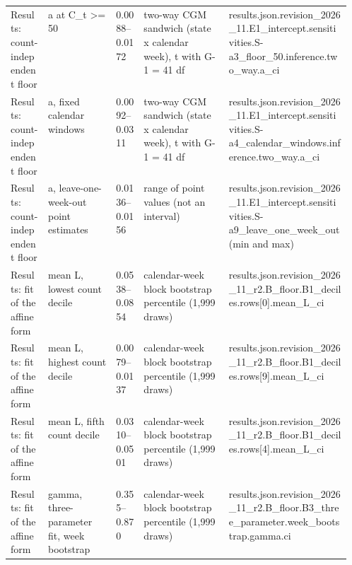 \begin{table}[!tbp]
\begin{tabularx}{\linewidth}{@{}p{0.11\linewidth}p{0.2\linewidth}lp{0.25\linewidth}X@{}}
Results: count-independent floor & a at C\_t >= 50 & 0.0088--0.0172 & two-way CGM sandwich (state x calendar week), t with G-1 = 41 df & {\ttfamily\tiny results.\allowbreak{}json.\allowbreak{}revision\_2026\_11.\allowbreak{}E1\_intercept.\allowbreak{}sensitivities.\allowbreak{}S-a3\_floor\_50.\allowbreak{}inference.\allowbreak{}two\_way.\allowbreak{}a\_ci} \\
Results: count-independent floor & a, fixed calendar windows & 0.0092--0.0311 & two-way CGM sandwich (state x calendar week), t with G-1 = 41 df & {\ttfamily\tiny results.\allowbreak{}json.\allowbreak{}revision\_2026\_11.\allowbreak{}E1\_intercept.\allowbreak{}sensitivities.\allowbreak{}S-a4\_calendar\_windows.\allowbreak{}inference.\allowbreak{}two\_way.\allowbreak{}a\_ci} \\
Results: count-independent floor & a, leave-one-week-out point estimates & 0.0136--0.0156 & range of point values (not an interval) & {\ttfamily\tiny results.\allowbreak{}json.\allowbreak{}revision\_2026\_11.\allowbreak{}E1\_intercept.\allowbreak{}sensitivities.\allowbreak{}S-a9\_leave\_one\_week\_out (min and max)} \\
Results: fit of the affine form & mean L, lowest count decile & 0.0538--0.0854 & calendar-week block bootstrap percentile (1,999 draws) & {\ttfamily\tiny results.\allowbreak{}json.\allowbreak{}revision\_2026\_11\_r2.\allowbreak{}B\_floor.\allowbreak{}B1\_deciles.\allowbreak{}rows\allowbreak{}[0].\allowbreak{}mean\_L\_ci} \\
Results: fit of the affine form & mean L, highest count decile & 0.0079--0.0137 & calendar-week block bootstrap percentile (1,999 draws) & {\ttfamily\tiny results.\allowbreak{}json.\allowbreak{}revision\_2026\_11\_r2.\allowbreak{}B\_floor.\allowbreak{}B1\_deciles.\allowbreak{}rows\allowbreak{}[9].\allowbreak{}mean\_L\_ci} \\
Results: fit of the affine form & mean L, fifth count decile & 0.0310--0.0501 & calendar-week block bootstrap percentile (1,999 draws) & {\ttfamily\tiny results.\allowbreak{}json.\allowbreak{}revision\_2026\_11\_r2.\allowbreak{}B\_floor.\allowbreak{}B1\_deciles.\allowbreak{}rows\allowbreak{}[4].\allowbreak{}mean\_L\_ci} \\
Results: fit of the affine form & gamma, three-parameter fit, week bootstrap & 0.355--0.870 & calendar-week block bootstrap percentile (1,999 draws) & {\ttfamily\tiny results.\allowbreak{}json.\allowbreak{}revision\_2026\_11\_r2.\allowbreak{}B\_floor.\allowbreak{}B3\_three\_parameter.\allowbreak{}week\_bootstrap.\allowbreak{}gamma.\allowbreak{}ci} \\

\end{tabularx}
\end{table}
